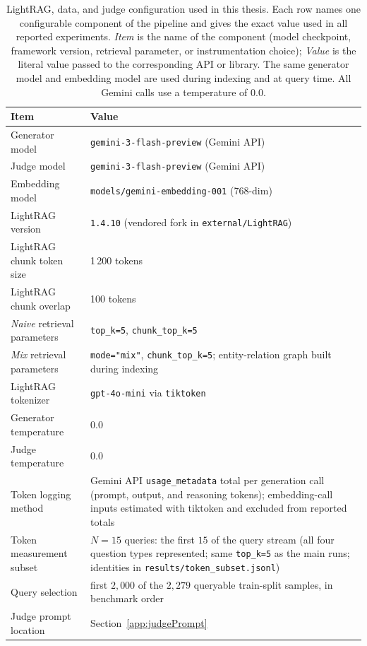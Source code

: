 \documentclass[english, bibtex]{kththesis}               %
\numberwithin{listing}{chapter}
\begin{document}
\begin{table}[!ht]
\centering
\caption{LightRAG, data, and judge configuration used in this thesis. Each row names one configurable component of the pipeline and gives the exact value used in all reported experiments. \emph{Item} is the name of the component (model checkpoint, framework version, retrieval parameter, or instrumentation choice); \emph{Value} is the literal value passed to the corresponding API or library. The same generator model and embedding model are used during indexing and at query time. All Gemini calls use a temperature of $0.0$.}
\label{tab:lightragDataJudgeConfig}
\begin{tabularx}{\textwidth}{p{}|X}
\textbf{Item} & \textbf{Value} \\
\hline
Generator model & \texttt{gemini-3-flash-preview} (Gemini API) \\
Judge model & \texttt{gemini-3-flash-preview} (Gemini API) \\
Embedding model & \texttt{models/gemini-embedding-001} (768-dim) \\
LightRAG version & \texttt{1.4.10} (vendored fork in \texttt{external/LightRAG}) \\
LightRAG chunk token size & 1\,200 tokens \\
LightRAG chunk overlap & 100 tokens \\
\emph{Naive} retrieval parameters & \texttt{top\_k=5}, \texttt{chunk\_top\_k=5} \\
\emph{Mix} retrieval parameters & \texttt{mode="mix"}, \texttt{chunk\_top\_k=5}; entity-relation graph built during indexing \\
LightRAG tokenizer & \texttt{gpt-4o-mini} via \texttt{tiktoken} \\
Generator temperature & 0.0 \\
Judge temperature & 0.0 \\
Token logging method & Gemini API \texttt{usage\_metadata} total per generation call (prompt, output, and reasoning tokens); embedding-call inputs estimated with tiktoken and excluded from reported totals \\
Token measurement subset & \(N = 15\) queries: the first $15$ of the query stream (all four question types represented; same \texttt{top\_k=5} as the main runs; identities in \texttt{results/token\_subset.jsonl}) \\
Query selection & first $2{,}000$ of the $2{,}279$ queryable train-split samples, in benchmark order \\
Judge prompt location & Section~\ref{app:judgePrompt} \\
\end{tabularx}
\end{table}
\end{document}
